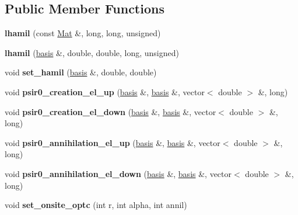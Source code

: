 \subsection*{Public Member Functions}
\begin{DoxyCompactItemize}
\item 
{\bfseries lhamil} (const \hyperlink{classMat}{Mat} \&, long, long, unsigned)\hypertarget{classlhamil_a2ddee02e033269d368705a05fb14efd0}{}\label{classlhamil_a2ddee02e033269d368705a05fb14efd0}

\item 
{\bfseries lhamil} (\hyperlink{classbasis}{basis} \&, double, double, long, unsigned)\hypertarget{classlhamil_a250d9537be375f85843646cc1d31aed0}{}\label{classlhamil_a250d9537be375f85843646cc1d31aed0}

\item 
void {\bfseries set\+\_\+hamil} (\hyperlink{classbasis}{basis} \&, double, double)\hypertarget{classlhamil_a26e9de83711358c0ad92a19363eddb11}{}\label{classlhamil_a26e9de83711358c0ad92a19363eddb11}

\item 
void {\bfseries psir0\+\_\+creation\+\_\+el\+\_\+up} (\hyperlink{classbasis}{basis} \&, \hyperlink{classbasis}{basis} \&, vector$<$ double $>$ \&, long)\hypertarget{classlhamil_ad09d3c2f6fa1fad58e106815fef1e592}{}\label{classlhamil_ad09d3c2f6fa1fad58e106815fef1e592}

\item 
void {\bfseries psir0\+\_\+creation\+\_\+el\+\_\+down} (\hyperlink{classbasis}{basis} \&, \hyperlink{classbasis}{basis} \&, vector$<$ double $>$ \&, long)\hypertarget{classlhamil_af02ba60d0b23bca49ae084a810243357}{}\label{classlhamil_af02ba60d0b23bca49ae084a810243357}

\item 
void {\bfseries psir0\+\_\+annihilation\+\_\+el\+\_\+up} (\hyperlink{classbasis}{basis} \&, \hyperlink{classbasis}{basis} \&, vector$<$ double $>$ \&, long)\hypertarget{classlhamil_ac92fecae2024da4c02ac2d257b70dacb}{}\label{classlhamil_ac92fecae2024da4c02ac2d257b70dacb}

\item 
void {\bfseries psir0\+\_\+annihilation\+\_\+el\+\_\+down} (\hyperlink{classbasis}{basis} \&, \hyperlink{classbasis}{basis} \&, vector$<$ double $>$ \&, long)\hypertarget{classlhamil_ac3062ae288f9e6edcb0ebe322490fe55}{}\label{classlhamil_ac3062ae288f9e6edcb0ebe322490fe55}

\item 
void {\bfseries set\+\_\+onsite\+\_\+optc} (int r, int alpha, int annil)\hypertarget{classlhamil_a08c5ae8976b11b4673259d7b5e09ebcb}{}\label{classlhamil_a08c5ae8976b11b4673259d7b5e09ebcb}


\end{DoxyCompactItemize}
